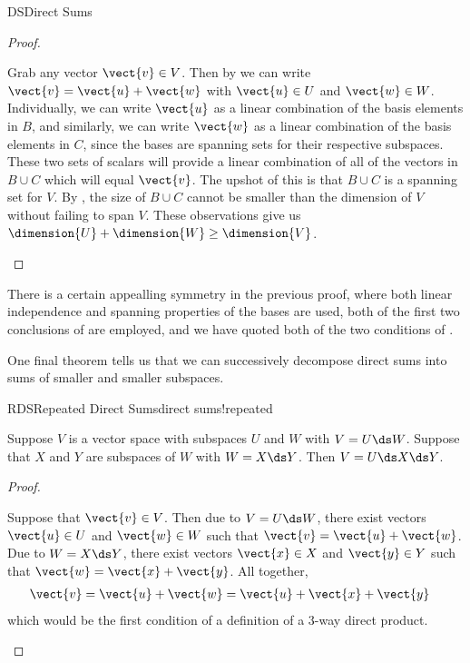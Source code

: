 \begin{subsect}{DS}{Direct Sums}
\begin{proof}
%
\begin{para}Grab any vector $\vect{v}\in V$.  Then by  we can write $\vect{v}=\vect{u}+\vect{w}$ with $\vect{u}\in U$ and $\vect{w}\in W$.  Individually, we can write $\vect{u}$ as a linear combination of the basis elements in $B$, and similarly, we can write $\vect{w}$ as a linear combination of the basis elements in $C$, since the bases are spanning sets for their respective subspaces.  These two sets of scalars will provide a linear combination of all of the vectors in $B\cup C$ which will equal $\vect{v}$.  The upshot of this is that $B\cup C$ is a spanning set for $V$.  By , the size of $B\cup C$ cannot be smaller than the dimension of $V$ without failing to span $V$.  These observations give us $\dimension{U}+\dimension{W}\geq\dimension{V}$.\end{para}
%
\end{proof}
%
\begin{para}There is a certain appealling symmetry in the previous proof, where both linear independence and spanning properties of the bases are used, both of the first two conclusions of  are employed, and we have quoted both of the two conditions of .\end{para}
%
\begin{para}One final theorem tells us that we can successively decompose direct sums into sums of smaller and smaller subspaces.\end{para}
%
\begin{theorem}{RDS}{Repeated Direct Sums}{direct sums!repeated}
\begin{para}Suppose $V$ is a vector space with subspaces $U$ and $W$ with $V=U\ds W$.  Suppose that $X$ and $Y$ are subspaces of $W$ with $W=X\ds Y$.  Then $V=U\ds X\ds Y$.\end{para}
\end{theorem}
%
\begin{proof}
\begin{para}Suppose that  $\vect{v}\in V$.  Then due to $V=U\ds W$, there exist vectors $\vect{u}\in U$ and $\vect{w}\in W$ such that $\vect{v}=\vect{u}+\vect{w}$.   Due to $W=X\ds Y$, there exist vectors $\vect{x}\in X$ and $\vect{y}\in Y$ such that $\vect{w}=\vect{x}+\vect{y}$.   All together,
%
\begin{align*}
\vect{v}&=\vect{u}+\vect{w}=\vect{u}+\vect{x}+\vect{y}
\end{align*}
%
which would be the first condition of a definition of a 3-way direct product.\end{para}

\end{proof}
\end{subsect}
